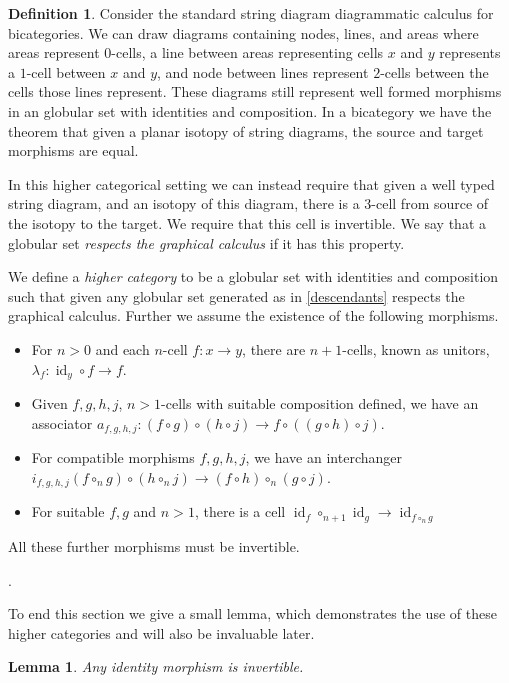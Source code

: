 \documentclass{article}
\newtheorem{lemma}{Lemma}
\theoremstyle{definition}
\newtheorem{definition}{Definition}
\theoremstyle{examplestyle}
\DeclareMathOperator{\id}{id}
\begin{document}
\begin{definition}\label{def:higher-cat}
  Consider the standard string diagram diagrammatic calculus for bicategories. We can draw diagrams containing nodes, lines, and areas where areas represent \(0\)-cells, a line between areas representing cells \(x\) and \(y\) represents a \(1\)-cell between \(x\) and \(y\), and node between lines represent \(2\)-cells between the cells those lines represent. These diagrams still represent well formed morphisms in an globular set with identities and composition. In a bicategory we have the theorem that given a planar isotopy of string diagrams, the source and target morphisms are equal.

  In this higher categorical setting we can instead require that given a well typed string diagram, and an isotopy of this diagram, there is a \(3\)-cell from source of the isotopy to the target. We require that this cell is invertible. We say that a globular set \emph{respects the graphical calculus} if it has this property.

  We define a \emph{higher category} to be a globular set with identities and composition such that given any globular set generated as in \cref{descendants} respects the graphical calculus. Further we assume the existence of the following morphisms.
  \begin{itemize}
  \item For \(n>0\) and each \(n\)-cell \(f: x \to y\), there are \(n+1\)-cells, known as unitors, \(\lambda_f: \id_y \circ f \to f\).
  \item Given \(f,g,h,j\), \(n>1\)-cells with suitable composition defined, we have an associator \(a_{f,g,h,j} : (f \circ g) \circ (h \circ j) \to f \circ ((g \circ h) \circ j)\).
  \item For compatible morphisms \(f,g,h,j\), we have an interchanger \(i_{f,g,h,j}(f \circ_n g) \circ (h \circ_n j) \to (f \circ h) \circ_n (g \circ j)\).
  \item For suitable \(f,g\) and \(n > 1\), there is a cell \(\id_f \circ_{n+1} \id_g \to \id_{f \circ_n g}\)
  \end{itemize}
  All these further morphisms must be invertible.
\end{definition}.

To end this section we give a small lemma, which demonstrates the use of these higher categories and will also be invaluable later.

\begin{lemma}\label{lem:identity}
  Any identity morphism is invertible.
\end{lemma}
\end{document}
